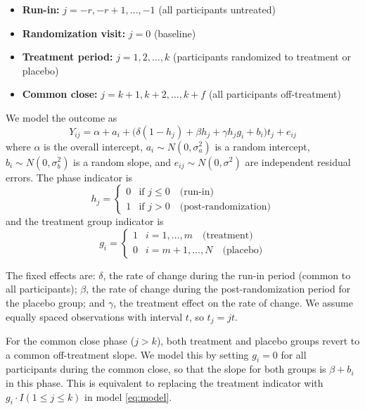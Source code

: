 \documentclass[
]{article}
\providecommand{\tightlist}{%
  \setlength{\itemsep}{0pt}\setlength{\parskip}{0pt}}
\begin{document}
\begin{itemize}
\tightlist
\item
  \textbf{Run-in:} \(j = -r, -r+1, \ldots, -1\) (all participants
  untreated)
\item
  \textbf{Randomization visit:} \(j = 0\) (baseline)
\item
  \textbf{Treatment period:} \(j = 1, 2, \ldots, k\) (participants
  randomized to treatment or placebo)
\item
  \textbf{Common close:} \(j = k+1, k+2, \ldots, k+f\) (all participants
  off-treatment)
\end{itemize}

We model the outcome as \begin{equation}
  Y_{ij} = \alpha + a_i +
  \bigl(\delta(1-h_j) + \beta h_j + \gamma h_j g_i + b_i
  \bigr) t_j + e_{ij}
  \label{eq:model}
\end{equation} where \(\alpha\) is the overall intercept,
\(a_i \sim N(0,
\sigma_a^2)\) is a random intercept, \(b_i \sim N(0,
\sigma_b^2)\) is a random slope, and \(e_{ij} \sim N(0,
\sigma^2)\) are independent residual errors. The phase indicator is \[
  h_j =
  \begin{cases}
    0 & \text{if } j \le 0 \quad \text{(run-in)} \\
    1 & \text{if } j > 0 \quad \text{(post-randomization)}
  \end{cases}
\] and the treatment group indicator is \[
  g_i =
  \begin{cases}
    1 & i = 1, \ldots, m
      \quad \text{(treatment)} \\
    0 & i = m+1, \ldots, N
      \quad \text{(placebo)}
  \end{cases}
\]

The fixed effects are: \(\delta\), the rate of change during the run-in
period (common to all participants); \(\beta\), the rate of change
during the post-randomization period for the placebo group; and
\(\gamma\), the treatment effect on the rate of change. We assume
equally spaced observations with interval \(t\), so \(t_j = jt\).

For the common close phase (\(j > k\)), both treatment and placebo
groups revert to a common off-treatment slope. We model this by setting
\(g_i = 0\) for all participants during the common close, so that the
slope for both groups is \(\beta
+ b_i\) in this phase. This is equivalent to replacing the treatment
indicator with \(g_i \cdot I(1 \le j \le k)\) in model \eqref{eq:model}.
\end{document}
